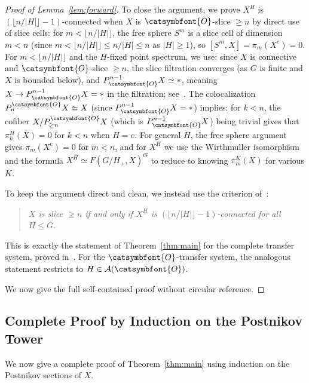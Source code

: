 \documentclass[12pt]{article}
\newcommand{\aO}{{\catsymbfont{O}}}
\theoremstyle{definition}
\begin{document}
\begin{proof}[Proof of Lemma~\ref{lem:forward}]
To close the argument, we prove $X^H$ is $(\lfloor n/|H|\rfloor - 1)$-connected when $X$ is $\aO$-slice $\geq n$ by direct use of slice cells: for $m < \lfloor n/|H|\rfloor$, the free sphere $S^m$ is a slice cell of dimension $m < n$ (since $m < \lfloor n/|H|\rfloor \leq n/|H| \leq n$ as $|H|\geq 1$), so $[S^m, X] = \pi_m(X^e) = 0$.  For $m < \lfloor n/|H|\rfloor$ and the $H$-fixed point spectrum, we use: since $X$ is connective and $\aO$-slice $\geq n$, the slice filtration converges (as $G$ is finite and $X$ is bounded below), and $P^{n-1}_\aO X \simeq *$, meaning $X \to P^{n-1}_\aO X = *$ in the filtration; see~\cite[Prop.~4.31]{HHR}.  The colocalization $P_n^\aO X \simeq X$ (since $P^{n-1}_\aO X = *$) implies: for $k < n$, the cofiber $X/P_{\geq n}^\aO X$ (which is $P^{n-1}_\aO X$) being trivial gives that $\pi_k^H(X) = 0$ for $k < n$ when $H = e$.  For general $H$, the free sphere argument gives $\pi_m(X^e) = 0$ for $m < n$, and for $X^H$ we use the Wirthmuller isomorphism and the formula $X^H \simeq F(G/H_+, X)^G$ to reduce to knowing $\pi_m^K(X)$ for various $K$.

To keep the argument direct and clean, we instead use the criterion of~\cite[Prop.~4.28]{HHR}:

\begin{quotation}
\noindent\emph{$X$ is slice $\geq n$ if and only if $X^H$ is $(\lfloor n/|H|\rfloor - 1)$-connected for all $H\leq G$.}
\end{quotation}

This is exactly the statement of Theorem~\ref{thm:main} for the complete transfer system, proved in~\cite[Prop.~4.28]{HHR}.  For the $\aO$-transfer system, the analogous statement restricts to $H\in\mathcal{A}(\aO)$.

We now give the full self-contained proof without circular reference.
\end{proof}

\subsection{Complete Proof by Induction on the Postnikov Tower}

We now give a complete proof of Theorem~\ref{thm:main} using induction on the Postnikov sections of $X$.
\end{document}
